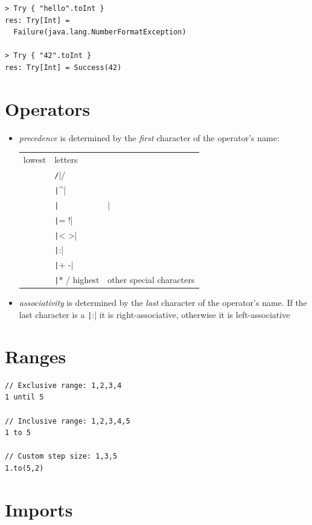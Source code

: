 \documentclass[10pt,landscape,a4paper]{article}
\begin{document}
\begin{multicols*}{4}
\begin{verbatim}
> Try { "hello".toInt }
res: Try[Int] =
  Failure(java.lang.NumberFormatException)

> Try { "42".toInt }
res: Try[Int] = Success(42)
\end{verbatim}
\section{Operators}
\begin{itemize}
\item \textit{precedence} is determined by the \textit{first} character of the
  operator's name:

  \begin{tabular}{l | l}
    lowest & letters \\
           & \texttt/|/ \\
           & \texttt|^| \\
           & \texttt|&| \\
           & \texttt|= !| \\
           & \texttt|< >| \\
           & \texttt|:| \\
           & \texttt|+ -| \\
           & \texttt|* / %
    highest & other special characters

  \end{tabular}
\item \textit{associativity} is determined by the \textit{last}
  character of the operator's name.  If the last character is a
  \texttt|:| it is right-associative, otherwise it is
  left-associative
\end{itemize}

\section{Ranges}

\begin{verbatim}
// Exclusive range: 1,2,3,4
1 until 5

// Inclusive range: 1,2,3,4,5
1 to 5

// Custom step size: 1,3,5
1.to(5,2)

\end{verbatim}

\section{Imports}


\end{multicols*}
\end{document}
